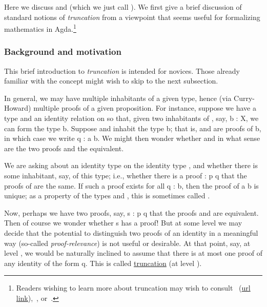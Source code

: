 Here we discuss  and  (which we just call ). We first give a brief discussion of standard notions of \emph{truncation} from a viewpoint that seems useful for formalizing mathematics in Agda.\footnote{Readers wishing to learn more about truncation may wish to consult~\cite[\S34]{MHE} (\href{https://www.cs.bham.ac.uk/~mhe/HoTT-UF-in-Agda-Lecture-Notes/HoTT-UF-Agda.html\#truncation}{url link}),~\cite{Brunerie:2012}, or~\cite[\S7.1]{HoTT}.}

\subsubsection{Background and motivation}\label{truncation}
This brief introduction to \emph{truncation} is intended for novices. Those already familiar with the concept might wish to skip to the next subsection.

In general, we may have multiple inhabitants of a given type, hence (via Curry-Howard) multiple proofs of a given proposition. For instance, suppose we have a type  and an identity relation  on  so that, given two inhabitants of , say,  \ab b \as : \ab X, we can form the type   \ab b. Suppose  and  inhabit the type   \ab b; that is,  and  are proofs of   \ab b, in which case we write  \ab q \as : \ab a  \ab b. We might then wonder whether and in
what sense are the two proofs  and  the equivalent.

We are asking about an identity type on the identity type , and whether there is some inhabitant, say,  of this type; i.e., whether there is a proof  \as : \ab p  \ab q that the proofs of    are the same. If such a proof exists for all  \ab q \as :   \ab b, then the proof of \ab a  \ab b is unique; as a property of the types  and , this is sometimes called .

Now, perhaps we have two proofs, say,  \ab s \as : \ab p  \ab q that the proofs  and  are equivalent. Then of course we wonder whether   \ab s has a proof!  But at some level we may decide that the potential to distinguish two proofs of an identity in a meaningful way (so-called \emph{proof-relevance}) is not useful or desirable. At that point, say, at level , we would be naturally inclined to assume that there is at most one proof of any identity of the form   \ab q. This is called \href{https://www.cs.bham.ac.uk/~mhe/HoTT-UF-in-Agda-Lecture-Notes/HoTT-UF-Agda.html\#truncation}{truncation} (at level ).

